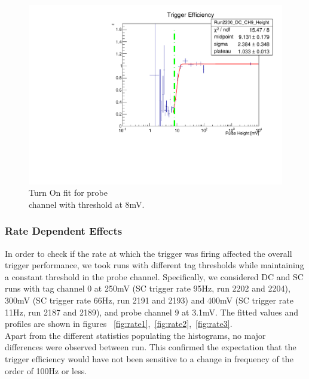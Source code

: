 \documentclass[12pt]{article}
\begin{document}
\begin{figure}[t!]
\centering
\centerline{\includegraphics[scale=0.43]{figures/triggerEfficiency/Efficiency_Run2200_DC_CH9_Height_vs_Run2191_SC_CH9_Height}}
{\caption{ Turn On fit for probe \\ channel with threshold at 8mV. }

\label{fig:turnon3}
}
\end{figure}


\subsubsection{Rate Dependent Effects}
In order to check if the rate at which the trigger was firing affected the overall trigger performance, we took runs with different tag thresholds while maintaining a constant threshold in the probe channel. Specifically, we considered DC and SC runs with tag channel 0 at 250mV (SC trigger rate 95Hz, run 2202 and 2204), 300mV (SC trigger rate 66Hz, run 2191 and 2193) and 400mV (SC trigger rate 11Hz, run 2187 and 2189), and probe channel 9 at 3.1mV. The fitted values and profiles are shown in figures ~\ref{fig:rate1},~\ref{fig:rate2},~\ref{fig:rate3}. \\ 
Apart from the different statistics populating the histograms, no major differences were observed between run. This confirmed the expectation that the trigger efficiency would have not been sensitive to a change in frequency of the order of 100Hz or less. 
\end{document}
